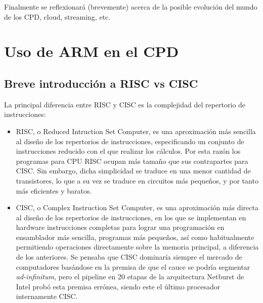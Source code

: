 \documentclass[a4paper,openright,12pt]{article}
\begin{document}
Finalmente se reflexionará (brevemente) acerca de la posible evolución del mundo de los CPD, cloud, streaming, etc.

\newpage
\section{Uso de ARM en el CPD}\label{section:uso_arm_cpd}
\subsection{Breve introducción a RISC vs CISC}\label{subsection:introduccion_risc_cisc}
La principal diferencia entre RISC y CISC es la complejidad del repertorio de instrucciones:
\begin{itemize}
    \item RISC, o Reduced Intruction Set Computer, es una aproximación más sencilla al diseño de los repertorios de instrucciones, especificando un conjunto de instrucciones reducido con el que
    realizar los cálculos. Por esta razón los programas para CPU RISC ocupan más tamaño que sus contrapartes para CISC. Sin embargo, dicha simplicidad se traduce en una menor cantidad de
    transistores, lo que a su vez se traduce en circuitos más pequeños, y por tanto más eficientes y baratos. \autocite[5]{measuring_moores_law_NBERc13897}
    \item CISC, o Complex Instruction Set Computer, es una aproximación más directa al diseño de los repertorios de instrucciones, en los que se implementan en hardware instrucciones
    completas para lograr una programación en ensamblador más sencilla, programas más pequeños, así como habitualmente permitiendo operaciones directamente sobre la memoria principal, a 
    diferencia de los anteriores. Se pensaba que CISC dominaría siempre el mercado de computadores basándose en la premisa de que el cauce se podría segmentar \emph{ad-infinitum}, pero el 
    pipeline en 20 etapas de la arquitectura Netburst de Intel probó esta premisa errónea, siendo este el último procesador internamente CISC. \autocite[10]{inside_netburst_architecture_carmean2000inside}
\end{itemize}
\end{document}
